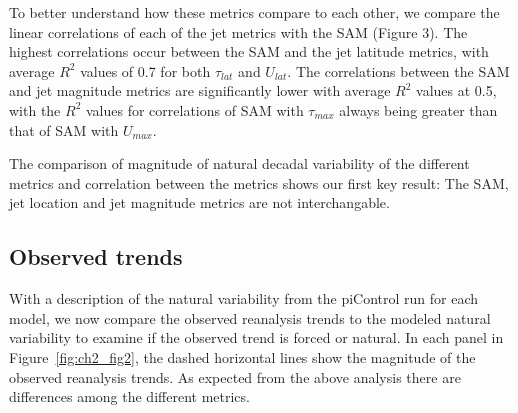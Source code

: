 To better understand how these metrics compare to each other, we compare the
linear correlations of each of the jet metrics with the SAM (Figure 3). The
highest correlations occur between the SAM and the jet latitude metrics, with
average $R^2$ values of 0.7 for both $\tau_{lat}$ and $U_{lat}$. The
correlations between the SAM and jet magnitude metrics are significantly lower
with average $R^2$ values at 0.5, with the $R^2$ values for correlations of SAM
with $\tau_{max}$ always being greater than that of SAM with $U_{max}$.

The comparison of magnitude of natural decadal variability of the different
metrics and correlation between the metrics shows our first key result: The SAM,
jet location and jet magnitude metrics are not interchangable.

\subsection{Observed trends}

With a description of the natural variability from the piControl run for each
model, we now compare the observed reanalysis trends to the modeled natural
variability to examine if the observed trend is forced or natural. In each panel
in Figure~\ref{fig:ch2_fig2}, the dashed horizontal lines show the magnitude of the observed
reanalysis trends.  As expected from the above analysis there are differences
among the different metrics.

